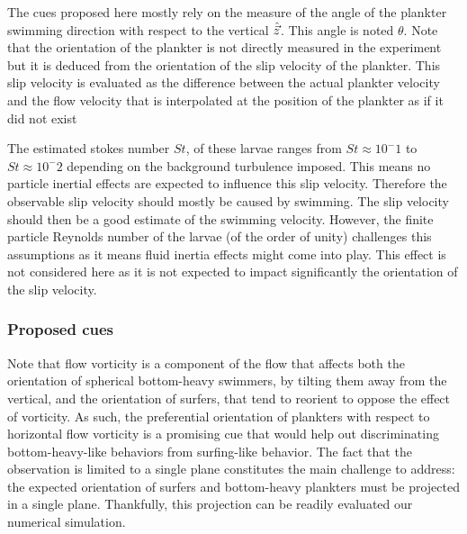 The cues proposed here mostly rely on the measure of the angle of the plankter swimming direction with respect to the vertical $\hat{\vec{z}}$.
This angle is noted $\theta$.
Note that the orientation of the plankter is not directly measured in the experiment but it is deduced from the orientation of the slip velocity of the plankter.
This slip velocity is evaluated as the difference between the actual plankter velocity and the flow velocity that is interpolated at the position of the plankter as if it did not exist

The estimated stokes number $\mathit{St}$, of these larvae ranges from $\mathit{St} \approx 10^-1$ to $\mathit{St} \approx 10^-2$ depending on the background turbulence imposed.
This means no particle inertial effects are expected to influence this slip velocity.
Therefore the observable slip velocity should mostly be caused by swimming.
The slip velocity should then be a good estimate of the swimming velocity.
However, the finite particle Reynolds number of the larvae (of the order of unity) challenges this assumptions as it means fluid inertia effects might come into play.
This effect is not considered here as it is not expected to impact significantly the orientation of the slip velocity.

\subsubsection{Proposed cues}

Note that flow vorticity is a component of the flow that affects both the orientation of spherical bottom-heavy swimmers, by tilting them away from the vertical, and the orientation of surfers, that tend to reorient to oppose the effect of vorticity.
As such, the preferential orientation of plankters with respect to horizontal flow vorticity is a promising cue that would help out discriminating bottom-heavy-like behaviors from surfing-like behavior.
The fact that the observation is limited to a single plane constitutes the main challenge to address: the expected orientation of surfers and bottom-heavy plankters must be projected in a single plane.
Thankfully, this projection can be readily evaluated our numerical simulation.

